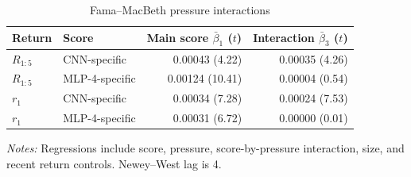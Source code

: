 \begin{table}[htbp]
\centering
\caption{Fama--MacBeth pressure interactions}
\label{tab:mechanism_interaction}
\begin{tabular}{llrr}
\toprule
Return & Score & Main score $\bar{\beta}_1$ ($t$) & Interaction $\bar{\beta}_3$ ($t$) \\
\midrule
$R_{1:5}$ & CNN-specific & 0.00043 (4.22) & 0.00035 (4.26) \\
$R_{1:5}$ & MLP-4-specific & 0.00124 (10.41) & 0.00004 (0.54) \\
$r_1$ & CNN-specific & 0.00034 (7.28) & 0.00024 (7.53) \\
$r_1$ & MLP-4-specific & 0.00031 (6.72) & 0.00000 (0.01) \\
\bottomrule
\end{tabular}
\begin{minipage}{0.92\linewidth}
\footnotesize
\textit{Notes:} Regressions include score, pressure, score-by-pressure interaction, size, and recent return controls. Newey--West lag is 4.
\end{minipage}
\end{table}
